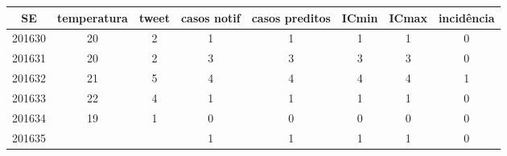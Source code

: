 \begin{tabular}{c|ccccccc}
  \hline
SE & temperatura & tweet & casos notif & casos preditos & ICmin & ICmax & incidência \\ 
  \hline
201630 & 20 & 2 & 1 & 1 & 1 & 1 & 0 \\ 
  201631 & 20 & 2 & 3 & 3 & 3 & 3 & 0 \\ 
  201632 & 21 & 5 & 4 & 4 & 4 & 4 & 1 \\ 
  201633 & 22 & 4 & 1 & 1 & 1 & 1 & 0 \\ 
  201634 & 19 & 1 & 0 & 0 & 0 & 0 & 0 \\ 
  201635 &  &  & 1 & 1 & 1 & 1 & 0 \\ 
   \hline
\end{tabular}
